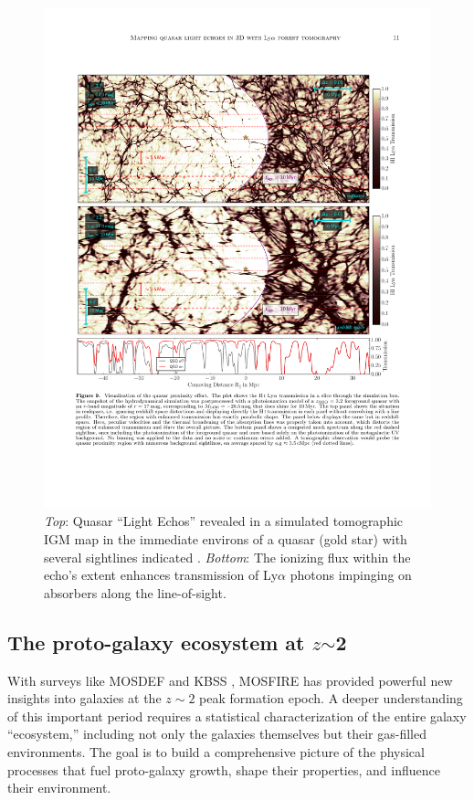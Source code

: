 \begin{figure}[h!]
%
\vskip -0.1in
%
\includegraphics[width=\textwidth]{figs/qso_LightEcho_v1.pdf}
%
\caption{{\it Top}: Quasar ``Light Echos'' revealed in a simulated tomographic IGM map in the immediate environs of a quasar (gold star) with several sightlines indicated \citep[from][]{2018arXiv181005156S}.  {\it Bottom}: The ionizing flux within the echo's extent enhances transmission of Ly$\alpha$ photons impinging on absorbers along the line-of-sight.}
%
\label{fig:LightEcho}
%
\end{figure}


\subsection{The proto-galaxy ecosystem at $z$$\sim$2}
\label{sec:z2galaxies}

With surveys like MOSDEF \citep{kriek15} and KBSS \citep[e.g.,][]{steidel14}, MOSFIRE has provided powerful new
insights into galaxies at the $z \sim 2$ peak formation epoch.  A deeper understanding of this important period
requires a statistical characterization of the entire galaxy ``ecosystem,'' including not only the galaxies themselves
but their gas-filled environments.  The goal is to build a comprehensive picture of the physical processes that fuel
proto-galaxy growth, shape their properties, and influence their environment.


